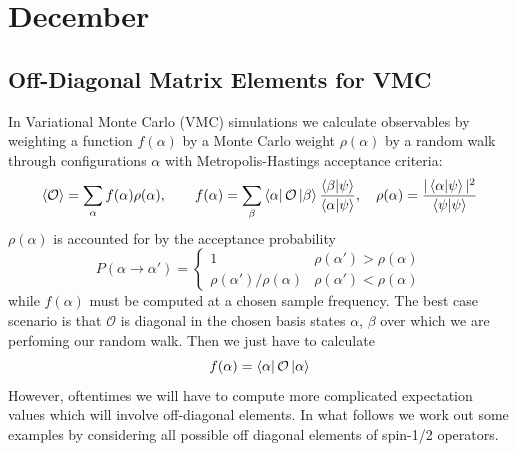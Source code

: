 \documentclass{report}
\begin{document}
\chapter{December}
\begin{tocbox}
	\minitoc
\end{tocbox}

\section{Off-Diagonal Matrix Elements for VMC}
In Variational Monte Carlo (VMC) simulations we calculate observables by 
weighting a function $ f(\alpha) $ by a Monte Carlo weight $ \rho(\alpha) $
by a random walk through configurations $ \alpha $ with Metropolis-Hastings 
acceptance criteria: 
\begin{equation*}
	\langle \mathcal{O} \rangle
		= \sum_\alpha f(\alpha)\rho(\alpha),\qquad 
		f(\alpha) = \sum_\beta \bra{\alpha}\mathcal{O}\ket{\beta}
			\frac{\braket{\beta}{\psi}}{\braket{\alpha}{\psi}},\quad 
			\rho(\alpha) = \frac{|\braket{\alpha}{\psi}|^2}{\braket{\psi}}
\end{equation*}
$ \rho(\alpha) $ is accounted for by the acceptance probability 
\begin{equation*}
	P(\alpha \rightarrow \alpha') 
		= \begin{cases}
		1 & \rho(\alpha') > \rho(\alpha)\\ 
		\rho(\alpha')/\rho(\alpha) & \rho(\alpha') < \rho(\alpha)
		\end{cases}
\end{equation*}
while $ f(\alpha) $ must be computed at a chosen sample frequency. The best 
case scenario is that $ \mathcal{O} $ is diagonal in the chosen basis 
states $ \alpha $, $ \beta $ over which we are perfoming our random walk. 
Then we just have to calculate 
\begin{equation*}
	f(\alpha) = \bra{\alpha}\mathcal{O}\ket{\alpha}
\end{equation*}
However, oftentimes we will have to compute more complicated expectation 
values which will involve off-diagonal elements. In what follows we work out 
some examples by considering all possible off diagonal elements of spin-1/2 
operators.
\end{document}
